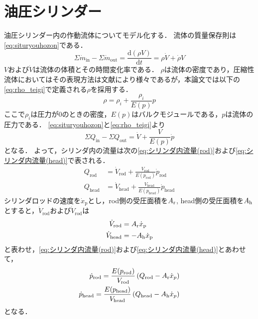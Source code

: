 \section{油圧シリンダー}
油圧シリンダー内の作動流体についてモデル化する．
流体の質量保存則は\eqnname\ref{eq:situryouhozon}である．
\begin{equation}
    \label{eq:situryouhozon}
\Sigma \dot{m}_{\mathrm{in}}-\Sigma \dot{m}_{\mathrm{out}} = \frac{\mathrm{d}(\rho V)}{\mathrm{d}t} = \rho \dot{V}+\dot{\rho}V
\end{equation}
$V$および$\dot{V}$は流体の体積とその時間変化率である．
$\rho$は流体の密度であり，圧縮性流体においてはその表現方法は文献により様々であるが，本論文では以下の\eqnname\ref{eq:rho_teigi}で定義される$\rho$を採用する．
\begin{equation}
    \label{eq:rho_teigi}
    \rho = \rho_i + \frac{\rho_i}{E(p)}p
\end{equation}
ここで$\rho_i$は圧力が0のときの密度，$E(p)$はバルクモジュールである，$p$は流体の圧力である．
\eqnname\ref{eq:situryouhozon}と\eqnname\ref{eq:rho_teigi}より
\begin{equation}
    \label{eq:流量保存}
    \Sigma Q_{\mathrm{in}} - \Sigma Q_{\mathrm{out}} = \dot{V} + \frac{V}{E(p)}\dot{p}
\end{equation}
となる．
よって，シリンダ内の流量は次の\eqnname\ref{eq:シリンダ内流量(rod)}および\eqnname\ref{eq:シリンダ内流量(head)}で表される．
\begin{align}
    \label{eq:シリンダ内流量(rod)}
    Q_{\mathrm{rod}}& = \dot{V}_\mathrm{rod} + \frac{V_\mathrm{rod}}{E(p_\mathrm{rod})}\dot{p}_\mathrm{rod}\\
    \label{eq:シリンダ内流量(head)}
    Q_{\mathrm{head}} &= \dot{V}_\mathrm{head} + \frac{V_\mathrm{head}}{E(p_\mathrm{head})}\dot{p}_\mathrm{head}
\end{align}
シリンダロッドの速度を$\dot{x}_\mathrm{p}$とし，rod側の受圧面積を$A_\mathrm{r}$,
head側の受圧面積を$A_\mathrm{h}$とすると，$\dot{V}_\mathrm{rod}$および$\dot{V}_\mathrm{rod}$は
\begin{align}
    \label{eq:dotVrod}
    \dot{V}_\mathrm{rod} &= A_\mathrm{r} \dot{x}_\mathrm{p} \\
    \label{eq:dotVhead}
    \dot{V}_\mathrm{head} &= -A_\mathrm{h} \dot{x}_\mathrm{p} 
\end{align}
と表わせ，\eqnname\ref{eq:シリンダ内流量(rod)}および\eqnname\ref{eq:シリンダ内流量(head)}とあわせて，
\begin{align}
    \label{eq:dp_rod}
    \dot{p}_\mathrm{rod}=\frac{E(p_\mathrm{rod})}{V_\mathrm{rod}}\left( Q_\mathrm{rod} - A_\mathrm{r} \dot{x}_p\right)\\
    \label{eq:dp_head}
    \dot{p}_\mathrm{head}=\frac{E(p_\mathrm{head})}{V_\mathrm{head}} \left( Q_\mathrm{head} - A_\mathrm{h} \dot{x}_p \right)
\end{align}
となる．


